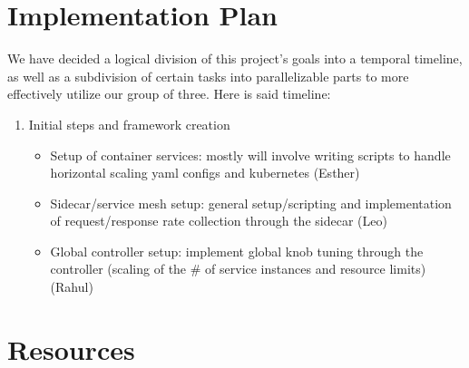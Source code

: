 \documentclass{proposal}
\begin{document}
\section{Implementation Plan} \label{implementation}
We have decided a logical division of this project's goals into a temporal timeline, as well as a subdivision of certain tasks into parallelizable parts to more effectively utilize our group of three. Here is said timeline:
\begin{enumerate}
    \item Initial steps and framework creation
    \begin{itemize}
        \item Setup of container services: mostly will involve writing scripts to handle horizontal scaling yaml configs and kubernetes (Esther)
        \item Sidecar/service mesh setup: general setup/scripting and implementation of request/response rate collection through the sidecar (Leo)
        \item Global controller setup: implement global knob tuning through the controller (scaling of the \# of service instances and resource limits) (Rahul)
    \end{itemize}
\end{enumerate}
\section{Resources}
\end{document}
